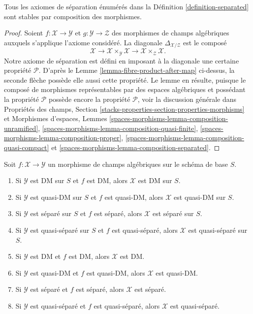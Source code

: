 \begin{lemma}
\label{lemma-composition-separated}
Tous les axiomes de séparation énumérés dans la Définition
\ref{definition-separated} sont stables par composition des morphismes.
\end{lemma}

\begin{proof}
Soient $f : \mathcal{X} \to \mathcal{Y}$ et
$g : \mathcal{Y} \to \mathcal{Z}$ des morphismes de champs algébriques
auxquels s'applique l'axiome considéré. La diagonale
$\Delta_{\mathcal{X}/\mathcal{Z}}$ est le composé
$$
\mathcal{X} \longrightarrow
\mathcal{X} \times_\mathcal{Y} \mathcal{X} \longrightarrow
\mathcal{X} \times_\mathcal{Z} \mathcal{X}.
$$
Notre axiome de séparation est défini en imposant à la diagonale une certaine
propriété $\mathcal{P}$. D'après le Lemme
\ref{lemma-fibre-product-after-map} ci-dessus, la seconde flèche possède elle
aussi cette propriété. Le lemme en résulte, puisque le composé de morphismes
représentables par des espaces algébriques et possédant la propriété
$\mathcal{P}$ possède encore la propriété $\mathcal{P}$, voir la discussion
générale dans Propriétés des champs,
Section \ref{stacks-properties-section-properties-morphisms}
et Morphismes d'espaces, Lemmes
\ref{spaces-morphisms-lemma-composition-unramified},
\ref{spaces-morphisms-lemma-composition-quasi-finite},
\ref{spaces-morphisms-lemma-composition-proper},
\ref{spaces-morphisms-lemma-composition-quasi-compact} et
\ref{spaces-morphisms-lemma-composition-separated}.
\end{proof}

\begin{lemma}
\label{lemma-separated-over-separated}
Soit $f : \mathcal{X} \to \mathcal{Y}$ un morphisme de champs algébriques
sur le schéma de base $S$.
\begin{enumerate}
\item Si $\mathcal{Y}$ est DM sur $S$ et $f$ est DM, alors $\mathcal{X}$ est
DM sur $S$.
\item Si $\mathcal{Y}$ est quasi-DM sur $S$ et $f$ est quasi-DM, alors
$\mathcal{X}$ est quasi-DM sur $S$.
\item Si $\mathcal{Y}$ est séparé sur $S$ et $f$ est séparé, alors
$\mathcal{X}$ est séparé sur $S$.
\item Si $\mathcal{Y}$ est quasi-séparé sur $S$ et $f$ est quasi-séparé,
alors $\mathcal{X}$ est quasi-séparé sur $S$.
\item Si $\mathcal{Y}$ est DM et $f$ est DM, alors $\mathcal{X}$ est DM.
\item Si $\mathcal{Y}$ est quasi-DM et $f$ est quasi-DM, alors $\mathcal{X}$
est quasi-DM.
\item Si $\mathcal{Y}$ est séparé et $f$ est séparé, alors $\mathcal{X}$ est
séparé.
\item Si $\mathcal{Y}$ est quasi-séparé et $f$ est quasi-séparé, alors
$\mathcal{X}$ est quasi-séparé.
\end{enumerate}
\end{lemma}


